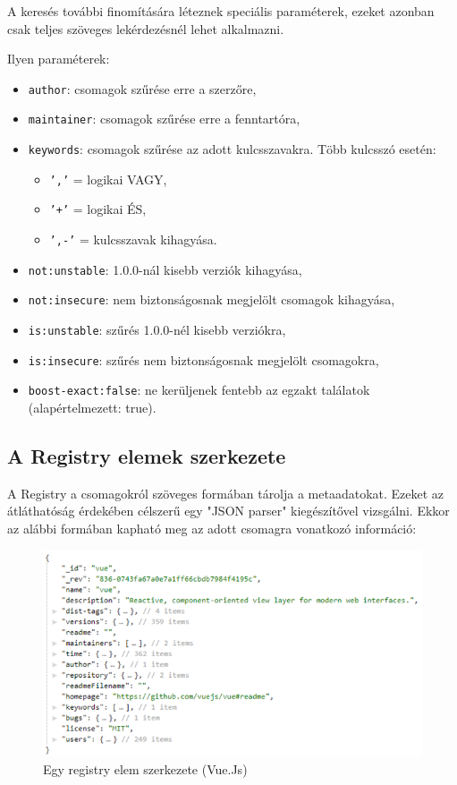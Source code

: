 \pagebreak

A keresés további finomítására léteznek speciális paraméterek, ezeket azonban csak teljes szöveges lekérdezésnél lehet alkalmazni.

Ilyen paraméterek:

\begin{itemize}
	\item \texttt{author}: csomagok szűrése erre a szerzőre,
	\item \texttt{maintainer}: csomagok szűrése erre a fenntartóra,
	\item \texttt{keywords}: csomagok szűrése az adott kulcsszavakra. Több kulcsszó esetén:
	\begin{itemize}
		\item \texttt{','} = logikai VAGY,
		\item \texttt{'+'} = logikai ÉS,
		\item \texttt{',-'} = kulcsszavak kihagyása.
	\end{itemize}
	\item \texttt{not:unstable}: 1.0.0-nál kisebb verziók kihagyása,
	\item \texttt{not:insecure}: nem biztonságosnak megjelölt csomagok kihagyása,
	\item \texttt{is:unstable}: szűrés 1.0.0-nél kisebb verziókra,
	\item \texttt{is:insecure}: szűrés nem biztonságosnak megjelölt csomagokra,
	\item \texttt{boost-exact:false}: ne kerüljenek fentebb az egzakt találatok (alapértelmezett: true).
\end{itemize}

\subsection{A Registry elemek szerkezete}

A Registry a csomagokról szöveges formában tárolja a metaadatokat. Ezeket az átláthatóság érdekében célszerű egy "JSON parser" kiegészítővel vizsgálni. Ekkor az alábbi formában kapható meg az adott csomagra vonatkozó információ:

\begin{figure}[h]
	\centering
	\includegraphics[scale=0.75]{images/registry_vue.png}
	\caption{Egy registry elem szerkezete (Vue.Js)}
	\label{fig:registry-package}
\end{figure}

